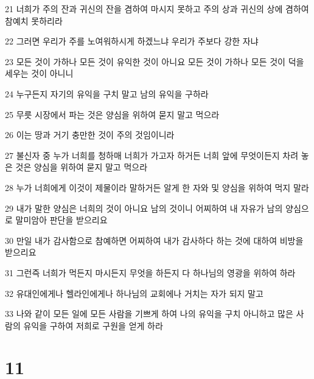 \par 21 너희가 주의 잔과 귀신의 잔을 겸하여 마시지 못하고 주의 상과 귀신의 상에 겸하여 참예치 못하리라
\par 22 그러면 우리가 주를 노여워하시게 하겠느냐 우리가 주보다 강한 자냐
\par 23 모든 것이 가하나 모든 것이 유익한 것이 아니요 모든 것이 가하나 모든 것이 덕을 세우는 것이 아니니
\par 24 누구든지 자기의 유익을 구치 말고 남의 유익을 구하라
\par 25 무릇 시장에서 파는 것은 양심을 위하여 묻지 말고 먹으라
\par 26 이는 땅과 거기 충만한 것이 주의 것임이니라
\par 27 불신자 중 누가 너희를 청하매 너희가 가고자 하거든 너희 앞에 무엇이든지 차려 놓은 것은 양심을 위하여 묻지 말고 먹으라
\par 28 누가 너희에게 이것이 제물이라 말하거든 알게 한 자와 및 양심을 위하여 먹지 말라
\par 29 내가 말한 양심은 너희의 것이 아니요 남의 것이니 어찌하여 내 자유가 남의 양심으로 말미암아 판단을 받으리요
\par 30 만일 내가 감사함으로 참예하면 어찌하여 내가 감사하다 하는 것에 대하여 비방을 받으리요
\par 31 그런즉 너희가 먹든지 마시든지 무엇을 하든지 다 하나님의 영광을 위하여 하라
\par 32 유대인에게나 헬라인에게나 하나님의 교회에나 거치는 자가 되지 말고
\par 33 나와 같이 모든 일에 모든 사람을 기쁘게 하여 나의 유익을 구치 아니하고 많은 사람의 유익을 구하여 저희로 구원을 얻게 하라

\chapter{11}

